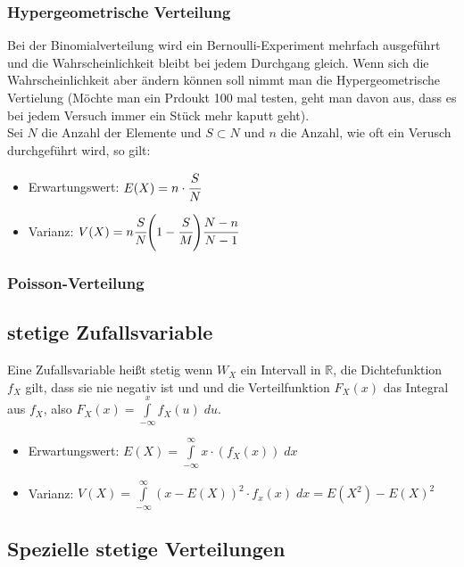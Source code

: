 \documentclass[a4paper]{scrartcl}
\begin{document}
            \subsubsection{Hypergeometrische Verteilung}
                Bei der Binomialverteilung wird ein Bernoulli-Experiment mehrfach ausgeführt und die Wahrscheinlichkeit bleibt bei jedem Durchgang gleich. Wenn sich die Wahrscheinlichkeit
                aber ändern können soll nimmt man die Hypergeometrische Vertielung (Möchte man ein Prdoukt 100 mal testen, geht man davon aus, dass es bei jedem Versuch immer ein Stück mehr kaputt geht).\\
                Sei \(N\) die Anzahl der Elemente und \(S \subset N\) und \(n\) die Anzahl, wie oft ein Verusch durchgeführt wird, so gilt: 
                \begin{itemize}
                    \item Erwartungswert: \(E(X) = n \cdot \cfrac{S}{N}\)
                    \item Varianz: \(V(X) = n \cfrac{S}{N} \Bigg(1 - \cfrac{S}{M} \Bigg) \cfrac{N - n}{N - 1} \)
                \end{itemize}
            \subsubsection{Poisson-Verteilung}
        \subsection{stetige Zufallsvariable}
            Eine Zufallsvariable heißt stetig wenn \(W_X\) ein Intervall in \(\mathbb{R}\), die Dichtefunktion \(f_X\) gilt, dass sie nie negativ ist und und die Verteilfunktion 
            \(F_X(x)\) das Integral aus \(f_X\), also \(F_X(x) = \int\limits_{-\infty }^x f_X(u) \; du\).
            \begin{itemize}
                \item Erwartungswert: \(E(X) = \int\limits_{-\infty}^{\infty} x \cdot (f_X(x)) \; dx \)
                \item Varianz: \(V(X) = \int\limits_{-\infty}^{\infty} (x - E(X))^2 \cdot f_x(x) \; dx = E(X^2) - E(X)^2 \)
            \end{itemize}
        \subsection{Spezielle stetige Verteilungen}
\end{document}
